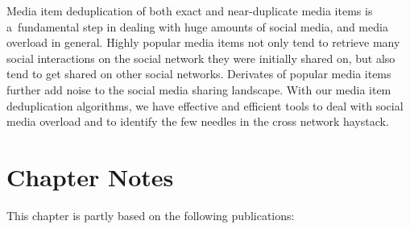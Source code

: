 Media item deduplication of both exact and near-duplicate media items
is a~fundamental step in dealing with huge amounts of social media,
and media overload in general.
Highly popular media items not only tend
to retrieve many social interactions on the social network
they were initially shared on, but also tend to get shared
on other social networks.
Derivates of popular media items further add noise
to the social media sharing landscape.
With our media item deduplication algorithms, 
we have effective and efficient tools to deal with social media overload
and to identify the few needles in the cross network haystack. 

\section*{Chapter Notes}
This chapter is partly based on the following publications:
